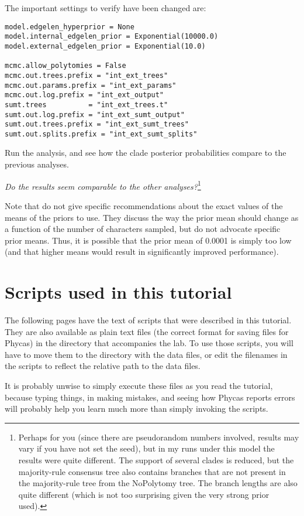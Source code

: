 \documentclass{article}
\newcommand{\phycas}{Phycas\xspace}
\newcommand{\QandA}[2]{\textit{#1}\footnote{#2}\xspace}
\begin{document}
The important settings to verify have been changed are:
\begin{verbatim}
model.edgelen_hyperprior = None
model.internal_edgelen_prior = Exponential(10000.0)
model.external_edgelen_prior = Exponential(10.0)

mcmc.allow_polytomies = False
mcmc.out.trees.prefix = "int_ext_trees"
mcmc.out.params.prefix = "int_ext_params"
mcmc.out.log.prefix = "int_ext_output"
sumt.trees          = "int_ext_trees.t"
sumt.out.log.prefix = "int_ext_sumt_output"
sumt.out.trees.prefix = "int_ext_sumt_trees"
sumt.out.splits.prefix = "int_ext_sumt_splits"
\end{verbatim}

Run the analysis, and see how the clade posterior probabilities compare to the previous analyses.

\QandA{Do the results seem comparable to the other analyses?}{Perhaps for you (since there are pseudorandom numbers involved, results may vary if you have not set the seed), but in my runs under this model the results were quite different.
The support of several clades is reduced, but the majority-rule consensus tree also contains 
branches that are not present in the majority-rule tree from the NoPolytomy tree.
The branch lengths are also quite different (which is not too surprising given the very strong prior 
used).}

Note that \citet{YangR2005} do not give specific recommendations about the exact values of the means of  the priors to use.
They discuss the way the prior mean should change as a function of the number of characters sampled, but
do not advocate specific prior means.
Thus, it is possible that the prior mean of 0.0001 is simply too low (and that higher means would result in significantly improved performance).




\newpage
\section{Scripts used in this tutorial}
The following pages have the text of scripts that 
were described in this tutorial.
They are also available as plain text files (the 
correct format for saving files for \phycas) in
the directory that accompanies the lab.
To use those scripts, you will have to move them
to the directory with the data files, or edit the
filenames in the scripts to reflect the relative 
path to the data files.

It is probably unwise to simply execute these files
as you read the tutorial, because typing things, in
making mistakes, and seeing how \phycas reports
errors will probably help you learn much more 
than simply invoking the scripts.
\newpage
\end{document}
